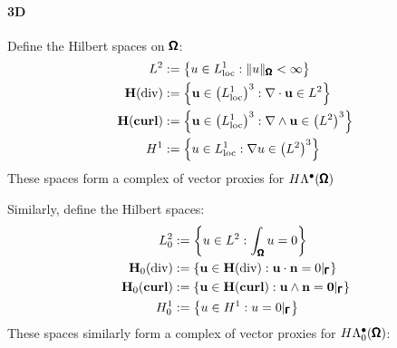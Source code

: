         \paragraph*{3D}
            Define the Hilbert spaces on $\pmb{\mathsf{\Omega}}$:
            \begin{align}
                L^{2}          &:=  \left\{u \in L^{1}_{\rm loc} : \|u\|_{\pmb{\mathsf{\Omega}}} < \infty\right\}  \\
                \mathbf{H}(\mathrm{div})   &:=  \left\{\mathbf{u} \in \left(L^{1}_{\rm loc}\right)^{3} : \nabla\cdot\mathbf{u} \in L^{2}\right\}  \\
                \mathbf{H}(\mathbf{curl})  &:=  \left\{\mathbf{u} \in \left(L^{1}_{\rm loc}\right)^{3} : \nabla\wedge\mathbf{u} \in \left(L^{2}\right)^{3}\right\}  \\
                H^{1}          &:=  \left\{u \in L^{1}_{\rm loc} : \nabla u \in \left(L^{2}\right)^{3}\right\}
            \end{align}
            These spaces form a complex of vector proxies for $H\Lambda^{\bullet}(\pmb{\mathsf{\Omega}})$ \BA{([Ref])}
            \begin{center}\end{center}
            Similarly, define the Hilbert spaces:
            \begin{align}
                L^{2}_{0}          &:=  \left\{u \in L^{2} : \int_{\pmb{\mathsf{\Omega}}}u = 0\right\}  \\
                \mathbf{H}_{0}(\mathrm{div})   &:=  \left\{\mathbf{u} \in \mathbf{H}(\mathrm{div}) : \mathbf{u}\cdot\mathbf{n} = 0|_{\pmb{\mathsf{\Gamma}}}\right\}  \\
                \mathbf{H}_{0}(\mathbf{curl})  &:=  \left\{\mathbf{u} \in \mathbf{H}(\mathbf{curl}) : \mathbf{u}\wedge\mathbf{n} = \mathbf{0}|_{\pmb{\mathsf{\Gamma}}}\right\}  \\
                H^{1}_{0}          &:=  \left\{u \in H^{1} : u = 0|_{\pmb{\mathsf{\Gamma}}}\right\}
            \end{align}
            These spaces similarly form a complex of vector proxies for $H\Lambda^{\bullet}_{0}(\pmb{\mathsf{\Omega}})$: \BA{([Ref])}
